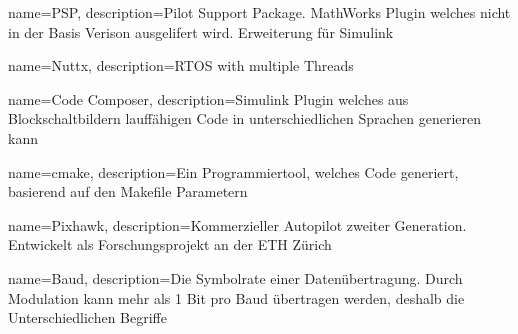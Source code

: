 {
    name=PSP,
    description={Pilot Support Package. MathWorks Plugin welches nicht in der Basis Verison ausgelifert wird. Erweiterung für Simulink}
}

{
    name=Nuttx,
    description={RTOS with multiple Threads}
}


{
    name=Code Composer,
    description={Simulink Plugin welches aus Blockschaltbildern lauffähigen Code in unterschiedlichen Sprachen generieren kann}
}


{
    name=cmake,
    description={Ein Programmiertool, welches Code generiert, basierend auf den Makefile Parametern}
}


{
    name=Pixhawk,
    description={Kommerzieller Autopilot zweiter Generation. Entwickelt als Forschungsprojekt an der ETH Zürich}
}


{
    name=Baud,
    description={Die Symbolrate einer Datenübertragung. Durch Modulation kann mehr als 1 Bit pro Baud übertragen werden, deshalb die Unterschiedlichen Begriffe}
}










